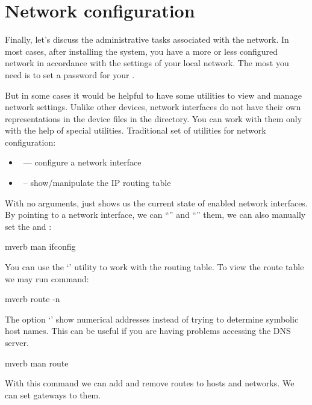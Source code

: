 \section*{Network configuration} %

Finally, let's discuss the administrative tasks associated with the network.
In most cases, after installing the system, you have a more or less configured
network in accordance with the  settings of your local network.
The most you need is to set a password for your .

But in some cases it would be helpful to have some utilities to view and
manage network settings. Unlike other devices, network interfaces do not
have their own representations in the device files in the  directory.
You can work with them only with the help of special utilities.
Traditional set of utilities for network configuration:
\begin{itemize}
\item {}~--- configure a network interface
\item {}~-- show/manipulate the IP routing table
\end{itemize}

With no arguments,  just shows us the current state of enabled
network interfaces. By pointing to a network interface, we can ``''
and ``'' them, we can also manually set the 
and :
\begin{code}{mverb}
man ifconfig
\end{code}

You can use the `' utility to work with the routing table.
To view the route table we may run command:
\begin{code}{mverb}
route -n
\end{code}
The option `' show  numerical  addresses instead of trying to determine
symbolic host names. This can be useful if you are having problems accessing
the DNS server.
\begin{code}{mverb}
man route
\end{code}
With this command we can add and remove routes to hosts and networks.
We can set gateways to them.

